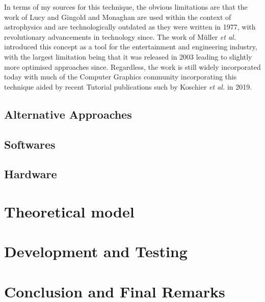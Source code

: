 \documentclass[a4paper,11pt]{article}
\begin{document}
\begin{multicols}{2}
In terms of my sources for this technique, the obvious limitations are that the work of Lucy \cite{lucy} and Gingold and Monaghan \cite{gingold} are used within the context of astrophysics and are technologically outdated as they were written in 1977, with revolutionary advancements in technology since. The work of Müller \textit{et al.} introduced this concept as a tool for the entertainment and engineering industry, with the largest limitation being that it was released in 2003 leading to slightly more optimised approaches since. Regardless, the work is still widely incorporated today with much of the Computer Graphics community incorporating this technique aided by recent Tutorial publications such by Koschier \textit{et al.} \cite{koschier} in 2019.
\subsection{Alternative Approaches}
\subsection{Softwares}
\subsection{Hardware}
\section{Theoretical model}
\section{Development and Testing}
\section{Conclusion and Final Remarks}

\newpage
\nocite{*}


\end{multicols}
\end{document}
